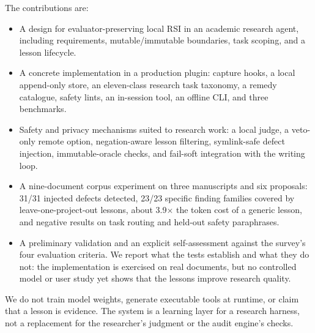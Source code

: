 The contributions are:
\begin{itemize}[leftmargin=1.4em,itemsep=2pt]
  \item A design for evaluator-preserving local RSI in an academic research agent, including requirements, mutable/immutable boundaries, task scoping, and a lesson lifecycle.
  \item A concrete implementation in a production plugin: capture hooks, a local append-only store, an eleven-class research task taxonomy, a remedy catalogue, safety lints, an in-session tool, an offline CLI, and three benchmarks.
  \item Safety and privacy mechanisms suited to research work: a local judge, a veto-only remote option, negation-aware lesson filtering, symlink-safe defect injection, immutable-oracle checks, and fail-soft integration with the writing loop.
  \item A nine-document corpus experiment on three manuscripts and six proposals: 31/31 injected defects detected, 23/23 specific finding families covered by leave-one-project-out lessons, about 3.9$\times$ the token cost of a generic lesson, and negative results on task routing and held-out safety paraphrases.
  \item A preliminary validation and an explicit self-assessment against the survey's four evaluation criteria. We report what the tests establish and what they do not: the implementation is exercised on real documents, but no controlled model or user study yet shows that the lessons improve research quality.
\end{itemize}

We do not train model weights, generate executable tools at runtime, or claim that a lesson is evidence. The system is a learning layer for a research harness, not a replacement for the researcher's judgment or the audit engine's checks.
